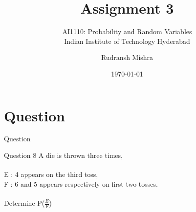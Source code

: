 \documentclass{beamer}
\title{Assignment 3}
\subtitle{\Large AI1110: Probability and Random Variables \\ \large Indian Institute of Technology Hyderabad}
\author{Rudransh Mishra}
\date{\today}
\begin{document}
\begin{frame}
    \titlepage 
\end{frame}

\logo{}


\section{Question}
\begin{frame}{Question}
    \begin{block}{Question 8}
        A die is thrown three times,\\\\
        E : 4 appears on the third toss,\\ 
        F : 6 and 5 appears respectively on first two tosses.\\\\
        Determine P(\(\frac{E}{F}\))\\
    \end{block}
\end{frame}
\end{document}
